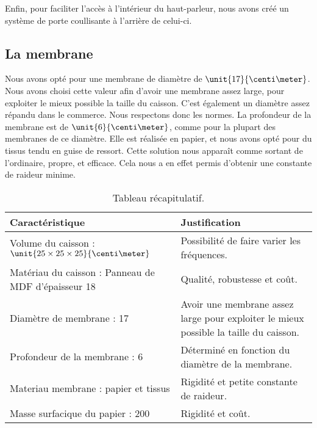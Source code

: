 Enfin, pour faciliter l'accès à l'intérieur du haut-parleur, nous avons créé un système de porte coullisante
à l'arrière de celui-ci.

\subsection{La membrane}
Nous avons opté pour une membrane de diamètre de $\unit{17}{\centi\meter}$. Nous avons choisi cette valeur afin
d'avoir une membrane assez large, pour exploiter le mieux possible la taille du caisson. C'est également un
diamètre assez répandu dans le commerce\cite{tlhp}. Nous respectons donc les normes.
La profondeur de la membrane est de $\unit{6}{\centi\meter}$, comme pour la plupart des membranes de ce
diamètre\cite{tlhp}. Elle est réalisée en papier, et nous avons opté pour du tissus tendu en guise de ressort.
Cette solution nous apparaît comme sortant de l'ordinaire, propre, et efficace. Cela nous a en effet permis
d'obtenir une constante de raideur minime.

\begin{table}[htb!]
	\centering
	\begin{tabularx}{\textwidth}{|X|X|}
	\hline
	\textbf{Caractéristique} & \textbf{Justification} \\
	\hline
	Volume du caisson : $\unit{25\times25\times25}{\centi\meter}$ & Possibilité de faire varier les fréquences. \\
	\hline
	Matériau du caisson : Panneau de MDF
	d'épaisseur \unit{18}{\milli\meter} & Qualité, robustesse et coût. \\
	\hline
	Diamètre de membrane : \unit{17}{\centi\meter} & Avoir une membrane assez large pour exploiter le mieux possible la taille du caisson. \\
	\hline
	Profondeur de la membrane : \unit{6}{\centi\meter} & Déterminé en fonction du diamètre de la membrane. \\
	\hline
	Materiau membrane : papier et tissus & Rigidité et petite constante de raideur. \\
	\hline
	Masse surfacique du papier : \unit{200}{\gram\per\meter\squared} & Rigidité et coût. \\
	\hline
	\end{tabularx}
	\caption{Tableau récapitulatif.}
\end{table}

